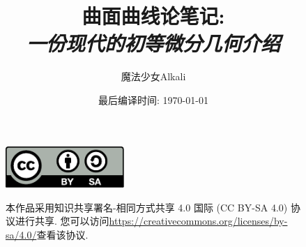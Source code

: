 \documentclass[11pt]{book}
\title{曲面曲线论笔记:\\{\itshape\Large 一份现代的初等微分几何介绍}}
\author{魔法少女Alkali}
\affil{北京师范大学数学科学学院}
\date{最后编译时间: \today}
\numberwithin{equation}{section}
\begin{document}
    \maketitle
    \vspace*{13cm}
    \thispagestyle{empty}
    \begin{figure}[ht]
        \includegraphics[width=0.4\textwidth]{by-sa.pdf}\hspace{0.05\textwidth}
        \begin{minipage}[b]{0.54\textwidth} %
        \small
        本作品采用知识共享署名-相同方式共享 4.0 国际 (CC BY-SA 4.0) 协议进行共享.
        您可以访问\url{https://creativecommons.org/licenses/by-sa/4.0/}查看该协议.
        \end{minipage}
    \end{figure}

    \frontmatter
    

    \tableofcontents

    \mainmatter
    
    
    
    
    

    \appendix
    \printbibliography[title={参考文献},heading=bibintoc]
\end{document}
